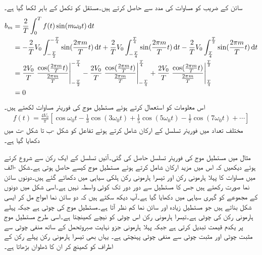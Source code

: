 سائن کے  ضریب   کو مساوات  کی مدد سے حاصل کرتے ہیں۔مستقل  کو تکمل کے باہر لکھا گیا ہے۔
\begin{align*}
b_m&=\frac{2}{T}\int_0^T f(t)\sin(m\omega_0 t) \dif t\\
&=-\frac{2}{T}V_0\int_{-\frac{T}{2}}^{-\frac{T}{4}} \sin (\frac{2\pi m}{T} t) \dif t+\frac{2}{T}V_0\int_{-\frac{T}{4}}^{\frac{T}{4}} \sin (\frac{2\pi m}{T} t) \dif t-\frac{2}{T}V_0\int_{\frac{T}{4}}^{\frac{T}{2}} \sin (\frac{2\pi m}{T} t) \dif t\\
&=\frac{2V_0}{T}\left.\frac{\cos (\frac{2\pi m}{T} t)}{\frac{2\pi m}{T}}\right|_{-\frac{T}{2}}^{-\frac{T}{4}}-\frac{2V_0}{T}\left.\frac{\cos (\frac{2\pi m}{T} t)}{\frac{2\pi m}{T}}\right|_{-\frac{T}{4}}^{\frac{T}{4}}+\frac{2V_0}{T}\left.\frac{\cos (\frac{2\pi m}{T} t)}{\frac{2\pi m}{T}}\right|_{\frac{T}{4}}^{\frac{T}{2}}\\
&=0
\end{align*}
اس معلومات کو استعمال کرتے ہوئے مستطیل موج کی فوریئر مساوات لکھتے ہیں۔
\begin{align}\label{مساوات_فوریئر_مستطیل_موج}
f(t)=\frac{4V_0}{\pi}\left[\cos \omega_0 t-\frac{1}{3}\cos(3\omega_0 t)+\frac{1}{5}\cos(5\omega_0 t)-\frac{1}{7}\cos(7\omega_0 t)+\cdots\right]
\end{align}
مختلف تعداد میں فوریئر تسلسل کے ارکان شامل کرتے ہوئے تفاعل کو شکل -ب تا شکل -ت میں دکھایا گیا ہے۔

مثال  میں مستطیل موج کی فوریئر تسلسل  حاصل کی گئی۔آئیں تسلسل کے ایک رکن سے شروع کرتے ہوئے دیکھیں کہ اس میں مزید ارکان شامل کرتے ہوئے مستطیل موج کیسے حاصل ہوتی ہے۔شکل -الف میں  مساوات  کا پہلا ہارمونی رکن  اور تیسرا ہارمونی رکن  ہلکی سیاہی میں دکھائے گئے ہیں۔دونوں سائن نما صورت رکھتے ہیں جس کا مستطیل سے دور دور تک کوئی واسطہ نہیں ہے۔اسی شکل میں دونوں کے مجموعے کو گہری سیاہی میں دکھایا گیا ہے۔آپ دیکھ سکتے ہیں کہ دو سائن نما امواج مل کر ایسی شکل بناتے ہیں جو مستطیل زیادہ اور سائن نما کم نظر آتا ہے۔مستطیل موج کی چوٹی  ہے جبکہ پہلے ہارمونی رکن کی چوٹی  ہے۔تیسرا ہارمونی رکن اس چوٹی کو نیچے کھینچتا ہے۔اسی طرح مستطیل موج  پر یکدم قیمت تبدیل کرتی ہے جبکہ پہلا ہارمونی جزو نہایت صبروتحمل کے ساتھ منفی چوٹی سے مثبت چوٹی اور مثبت چوٹی سے منفی چوٹی پہنچتی ہے۔ یہاں بھی تیسرا ہارمونی رکن پہلے رکن کے اطراف کو کھینچ کر ان کا ڈھلوان بڑھاتا ہے۔

